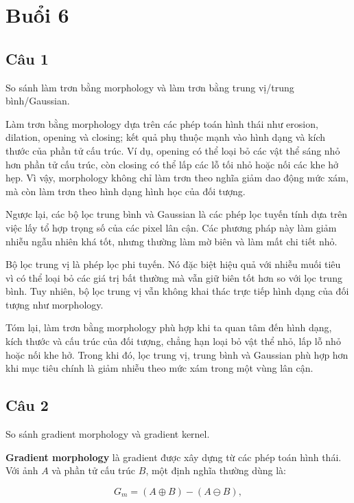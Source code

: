 \chapter{Buổi 6}
\label{Chapter6}
\setcounter{secnumdepth}{5}

\section*{Câu 1}
So sánh làm trơn bằng morphology và làm trơn bằng trung vị/trung bình/Gaussian.

Làm trơn bằng morphology dựa trên các phép toán hình thái như erosion, dilation, opening và closing; kết quả phụ thuộc mạnh vào hình dạng và kích thước của phần tử cấu trúc. Ví dụ, opening có thể loại bỏ các vật thể sáng nhỏ hơn phần tử cấu trúc, còn closing có thể lấp các lỗ tối nhỏ hoặc nối các khe hở hẹp. Vì vậy, morphology không chỉ làm trơn theo nghĩa giảm dao động mức xám, mà còn làm trơn theo hình dạng hình học của đối tượng.

Ngược lại, các bộ lọc trung bình và Gaussian là các phép lọc tuyến tính dựa trên việc lấy tổ hợp trọng số của các pixel lân cận. Các phương pháp này làm giảm nhiễu ngẫu nhiên khá tốt, nhưng thường làm mờ biên và làm mất chi tiết nhỏ.

Bộ lọc trung vị là phép lọc phi tuyến. Nó đặc biệt hiệu quả với nhiễu muối tiêu vì có thể loại bỏ các giá trị bất thường mà vẫn giữ biên tốt hơn so với lọc trung bình. Tuy nhiên, bộ lọc trung vị vẫn không khai thác trực tiếp hình dạng của đối tượng như morphology.

Tóm lại, làm trơn bằng morphology phù hợp khi ta quan tâm đến hình dạng, kích thước và cấu trúc của đối tượng, chẳng hạn loại bỏ vật thể nhỏ, lấp lỗ nhỏ hoặc nối khe hở. Trong khi đó, lọc trung vị, trung bình và Gaussian phù hợp hơn khi mục tiêu chính là giảm nhiễu theo mức xám trong một vùng lân cận.

\section*{Câu 2}
So sánh gradient morphology và gradient kernel.

\textbf{Gradient morphology} là gradient được xây dựng từ các phép toán hình thái. Với ảnh $A$ và phần tử cấu trúc $B$, một định nghĩa thường dùng là:

\begin{equation}
    G_m = (A \oplus B) - (A \ominus B),
\end{equation}

